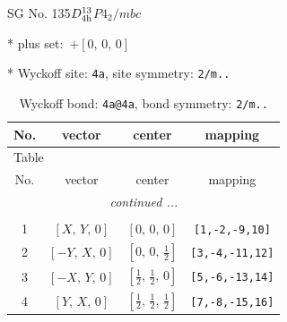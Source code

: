 \documentclass[fleqn,8pt]{jsarticle}
\begin{document}
\setcounter{MaxMatrixCols}{32}

\renewcommand{\tablename}{Table~}
\renewcommand{\figurename}{Figure~}
\begin{center}
\LARGE
SG No. 135\quad$D_{\rm 4h}^{13}$\quad$P4_2/mbc$\quad[ tetragonal ]
\end{center}

* plus set:\,\,\,$+\left[ 0,\, 0,\, 0 \right]$


* Wyckoff site: {\tt 4a}, site symmetry: {\tt 2/m..}
\renewcommand{\arraystretch}{1.2}
\begin{longtable}{cccc}
\caption{Wyckoff bond: {\tt 4a@4a}, bond symmetry: {\tt 2/m..}}
 \\
 \hline \hline
No. & vector & center & mapping \\ \hline \endfirsthead

\multicolumn{3}{l}{\tablename\ \thetable{}} \\
 \hline \hline
No. & vector & center & mapping \\ \hline \endhead

 \hline \hline
\multicolumn{3}{r}{\footnotesize\it continued ...} \\ \endfoot

 \hline \hline
\multicolumn{3}{r}{} \\ \endlastfoot

1 & $\left[ X,\, Y,\, 0 \right]$ & $\left[ 0,\, 0,\, 0 \right]$ & {\tt [1,-2,-9,10]} \\ \hline
2 & $\left[ - Y,\, X,\, 0 \right]$ & $\left[ 0,\, 0,\, \frac{1}{2} \right]$ & {\tt [3,-4,-11,12]} \\ \hline
3 & $\left[ - X,\, Y,\, 0 \right]$ & $\left[ \frac{1}{2},\, \frac{1}{2},\, 0 \right]$ & {\tt [5,-6,-13,14]} \\ \hline
4 & $\left[ Y,\, X,\, 0 \right]$ & $\left[ \frac{1}{2},\, \frac{1}{2},\, \frac{1}{2} \right]$ & {\tt [7,-8,-15,16]} \\
\end{longtable}
\renewcommand{\arraystretch}{1.2}
\end{document}
